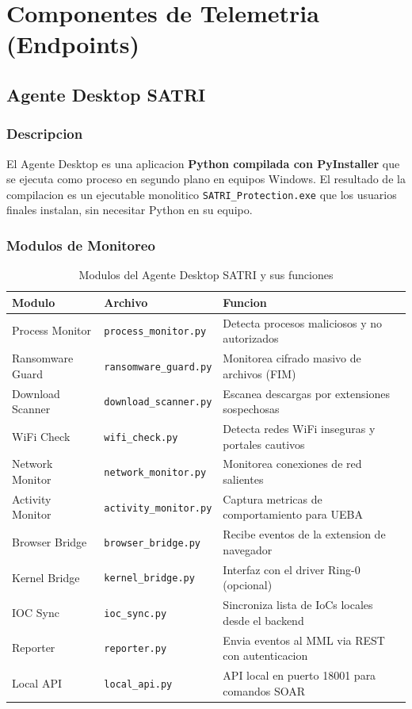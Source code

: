 \documentclass[12pt, a4paper]{report}
\begin{document}
\chapter{Componentes de Telemetria (Endpoints)}

\section{Agente Desktop SATRI}

\subsection{Descripcion}
El Agente Desktop es una aplicacion \textbf{Python compilada con PyInstaller} que se ejecuta como proceso en segundo plano en equipos Windows. El resultado de la compilacion es un ejecutable monolitico \texttt{SATRI\_Protection.exe} que los usuarios finales instalan, sin necesitar Python en su equipo.

\subsection{Modulos de Monitoreo}

\begin{table}[H]
\centering
\caption{Modulos del Agente Desktop SATRI y sus funciones}
\begin{tabular}{@{}p{3.5cm}p{4cm}p{5cm}@{}}
\toprule
\textbf{Modulo} & \textbf{Archivo} & \textbf{Funcion} \\
\midrule
Process Monitor     & \texttt{process\_monitor.py}   & Detecta procesos maliciosos y no autorizados \\
Ransomware Guard    & \texttt{ransomware\_guard.py}  & Monitorea cifrado masivo de archivos (FIM) \\
Download Scanner    & \texttt{download\_scanner.py}  & Escanea descargas por extensiones sospechosas \\
WiFi Check          & \texttt{wifi\_check.py}        & Detecta redes WiFi inseguras y portales cautivos \\
Network Monitor     & \texttt{network\_monitor.py}   & Monitorea conexiones de red salientes \\
Activity Monitor    & \texttt{activity\_monitor.py}  & Captura metricas de comportamiento para UEBA \\
Browser Bridge      & \texttt{browser\_bridge.py}    & Recibe eventos de la extension de navegador \\
Kernel Bridge       & \texttt{kernel\_bridge.py}     & Interfaz con el driver Ring-0 (opcional) \\
IOC Sync            & \texttt{ioc\_sync.py}          & Sincroniza lista de IoCs locales desde el backend \\
Reporter            & \texttt{reporter.py}           & Envia eventos al MML via REST con autenticacion \\
Local API           & \texttt{local\_api.py}         & API local en puerto 18001 para comandos SOAR \\
\bottomrule
\end{tabular}
\end{table}
\end{document}
